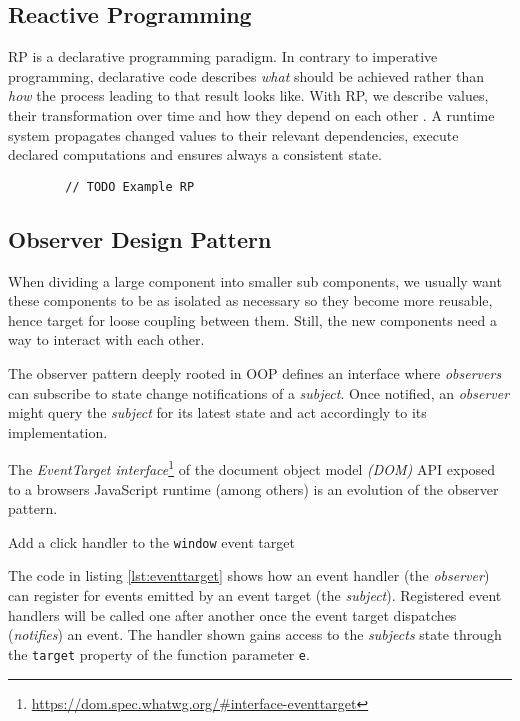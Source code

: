 \documentclass[12pt,a4paper]{article}
\begin{document}
\subsection{Reactive Programming}
RP is a declarative programming paradigm. In contrary to imperative programming, declarative code describes \emph{what} should be achieved rather than \emph{how} the process leading to that result looks like. With RP, we describe values, their transformation over time and how they depend on each other \cite{8354906}. A runtime system propagates changed values to their relevant dependencies, execute declared computations and ensures always a consistent state.

\begin{listing}[H]
	\begin{verbatim}
		// TODO Example RP
	\end{verbatim}
	\caption{}
	\label{lst:basic-rp-with-baconjs}
\end{listing}

\subsection{Observer Design Pattern}
When dividing a large component into smaller sub components, we usually want these components to be as isolated as necessary so they become more reusable, hence target for loose coupling between them. Still, the new components need a way to interact with each other.

The observer pattern \cite{gamma1995design} deeply rooted in OOP defines an interface where \emph{observers} can subscribe to state change notifications of a \emph{subject}. Once notified, an \emph{observer} might query the \emph{subject} for its latest state and act accordingly to its implementation.

The \emph{EventTarget interface}\footnote{\url{https://dom.spec.whatwg.org/\#interface-eventtarget}} of the document object model \emph{(DOM)} API exposed to a browsers JavaScript runtime (among others) is an evolution of the observer pattern.

\begin{listing}[H]
	\caption{Add a click handler to the \texttt{window} event target}
	\label{lst:eventtarget}
\end{listing}

The code in listing \ref{lst:eventtarget} shows how an event handler (the \emph{observer}) can register for events emitted by an event target (the \emph{subject}). Registered event handlers will be called one after another once the event target dispatches (\emph{notifies}) an event. The handler shown gains access to the \emph{subjects} state through the \texttt{target} property of the function parameter \texttt{e}.
\end{document}
